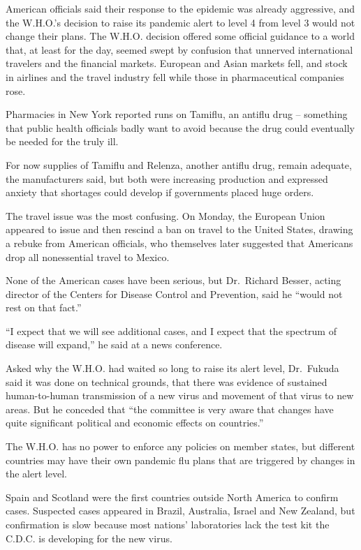 \documentclass[12pt,a4paper,onecolumn]{article}
\begin{document}
American officials said their response to the epidemic was already aggressive, and the W.H.O.'s
decision to raise its pandemic alert to level 4 from level 3 would not change their plans. The
W.H.O. decision offered some official guidance to a world that, at least for the day, seemed swept
by confusion that unnerved international travelers and the financial markets. European and Asian
markets fell, and stock in airlines and the travel industry fell while those in pharmaceutical
companies rose.

Pharmacies in New York reported runs on Tamiflu, an antiflu drug -- something that public health
officials badly want to avoid because the drug could eventually be needed for the truly ill.

For now supplies of Tamiflu and Relenza, another antiflu drug, remain adequate, the manufacturers
said, but both were increasing production and expressed anxiety that shortages could develop if
governments placed huge orders.

The travel issue was the most confusing. On Monday, the European Union appeared to issue and then
rescind a ban on travel to the United States, drawing a rebuke from American officials, who
themselves later suggested that Americans drop all nonessential travel to Mexico.

None of the American cases have been serious, but Dr.~Richard Besser, acting director of the Centers
for Disease Control and Prevention, said he ``would not rest on that fact.''

``I expect that we will see additional cases, and I expect that the spectrum of disease will
expand,'' he said at a news conference.

Asked why the W.H.O. had waited so long to raise its alert level, Dr.~Fukuda said it was done on
technical grounds, that there was evidence of sustained human-to-human transmission of a new virus
and movement of that virus to new areas. But he conceded that ``the committee is very aware that
changes have quite significant political and economic effects on countries.''

The W.H.O. has no power to enforce any policies on member states, but different countries may have
their own pandemic flu plans that are triggered by changes in the alert level.

Spain and Scotland were the first countries outside North America to confirm cases. Suspected cases
appeared in Brazil, Australia, Israel and New Zealand, but confirmation is slow because most
nations' laboratories lack the test kit the C.D.C. is developing for the new virus.
\end{document}
